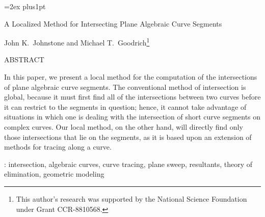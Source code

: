 
\SingleSpace
\setlength{\oddsidemargin}{-.2in}
\setlength{\evensidemargin}{0pt}
\setlength{\headsep}{0pt}
\setlength{\topmargin}{-.5in}
\setlength{\textheight}{10.2in}
\setlength{\textwidth}{7in}
\pagestyle{empty}
\parskip=2ex plus1pt		%
\parindent=0pt			%
% 

\noindent A Localized Method for Intersecting Plane Algebraic Curve Segments

\hspace{4ex}

\noindent John K.\ Johnstone and Michael T.\ Goodrich\footnote{This 
	author's research was supported by
	the National Science Foundation under Grant CCR-8810568.}

\vspace{20ex}

\noindent ABSTRACT

\vspace{3ex}
\noindent In this paper, we present a local method for the 
computation of the intersections of plane algebraic curve segments.
The conventional method of intersection is global, because it must first find all 
of the intersections between two curves before it can restrict to the segments in question;
hence, it cannot take advantage of situations in which one is dealing with the intersection of
short curve segments on complex curves.
Our local method, on the other hand, will directly find only those intersections that lie 
on the segments, as it is based upon an extension of methods for tracing along a curve.

\vspace{3ex}
: intersection, algebraic curves, curve tracing, plane sweep, 
resultants, theory of elimination, geometric modeling

